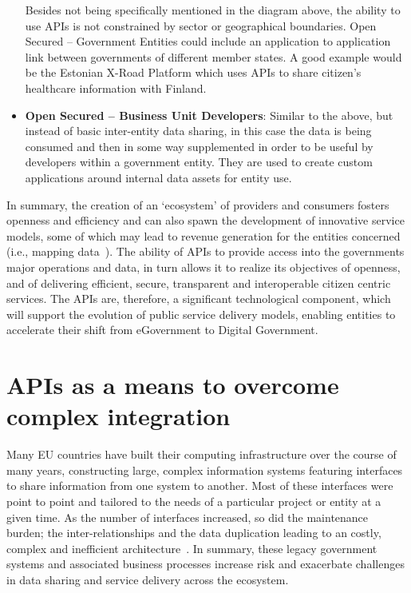 \begin{itemize}
	 Besides not being specifically mentioned in the diagram above, the ability to use
	 APIs is not constrained by sector or geographical boundaries. Open Secured
	 – Government Entities could include an application to application link
	 between governments of different member states. A good example would be the Estonian X-Road Platform which uses APIs to
	 share citizen’s healthcare information with Finland.
	 
	 \item \textbf{Open Secured – Business Unit Developers}: Similar to the above, but instead of basic inter-entity data sharing, in this case the data is being
	 consumed and then in some way supplemented in order to be useful by developers
	 within a government entity. They are used to create custom applications around
	 internal data assets for entity use.
\end{itemize}

In summary, the creation of an ‘ecosystem’ of providers and consumers fosters
openness and efficiency and can also spawn the development of innovative service
models, some of which may lead to revenue generation for the entities concerned
(i.e., mapping data~\citep{os_places}). The ability of APIs to provide access
into the governments major operations and data, in turn allows it to realize its objectives
of openness, and of delivering efficient, secure, transparent and interoperable
citizen centric services. The APIs are, therefore, a significant technological
component, which will support the evolution of public service delivery
models, enabling entities to accelerate their shift from eGovernment to
Digital Government.

\section{APIs as a means to overcome complex integration}

Many EU countries have built their computing infrastructure over the course of
many years, constructing large, complex information systems featuring
interfaces to share information from one system to another. Most of these
interfaces were point to point and tailored to the needs of a particular
project or entity at a given time. As the number of interfaces increased, so did the
maintenance burden; the inter-relationships and the data duplication leading to an
costly, complex and inefficient architecture~\citep{deloitte_insights}. In summary, these
legacy government systems and associated business processes increase
risk and exacerbate challenges in data sharing and service delivery across the
ecosystem.

